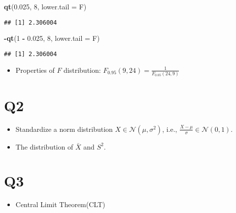 \documentclass[
]{book}
\newenvironment{Shaded}{\begin{snugshade}}{\end{snugshade}}
\newcommand{\DataTypeTok}[1]{\textcolor[rgb]{0.13,0.29,0.53}{#1}}
\newcommand{\DecValTok}[1]{\textcolor[rgb]{0.00,0.00,0.81}{#1}}
\newcommand{\FloatTok}[1]{\textcolor[rgb]{0.00,0.00,0.81}{#1}}
\newcommand{\KeywordTok}[1]{\textcolor[rgb]{0.13,0.29,0.53}{\textbf{#1}}}
\newcommand{\NormalTok}[1]{#1}
\newcommand{\OperatorTok}[1]{\textcolor[rgb]{0.81,0.36,0.00}{\textbf{#1}}}
\newcommand{\StringTok}[1]{\textcolor[rgb]{0.31,0.60,0.02}{#1}}
\providecommand{\tightlist}{%
  \setlength{\itemsep}{0pt}\setlength{\parskip}{0pt}}
\theoremstyle{definition}
\theoremstyle{definition}
\theoremstyle{definition}
\theoremstyle{remark}
\begin{document}
\begin{Shaded}
\begin{Highlighting}[]
\KeywordTok{qt}\NormalTok{(}\FloatTok{0.025}\NormalTok{, }\DecValTok{8}\NormalTok{, }\DataTypeTok{lower.tail =}\NormalTok{ F)}
\end{Highlighting}
\end{Shaded}

\begin{verbatim}
## [1] 2.306004
\end{verbatim}

\begin{Shaded}
\begin{Highlighting}[]
\OperatorTok{-}\KeywordTok{qt}\NormalTok{(}\DecValTok{1} \OperatorTok{-}\StringTok{ }\FloatTok{0.025}\NormalTok{, }\DecValTok{8}\NormalTok{, }\DataTypeTok{lower.tail =}\NormalTok{ F)}
\end{Highlighting}
\end{Shaded}

\begin{verbatim}
## [1] 2.306004
\end{verbatim}

\begin{itemize}
\tightlist
\item
  Properties of \(F\) distribution: \(F_{0.95}(9,24)= \frac{1}{F_{0.05}(24,9)}\)
\end{itemize}

\hypertarget{q2}{%
\section{Q2}\label{q2}}

\begin{itemize}
\item
  Standardize a norm distribution \(X\in\mathcal{N}(\mu,\sigma^2)\), i.e., \(\frac{X-\mu}{\sigma}\in\mathcal{N}(0,1)\).
\item
  The distribution of \(\bar X\) and \(S^2\).
\end{itemize}

\hypertarget{q3}{%
\section{Q3}\label{q3}}

\begin{itemize}
\tightlist
\item
  Central Limit Theorem(CLT)
\end{itemize}
\end{document}
